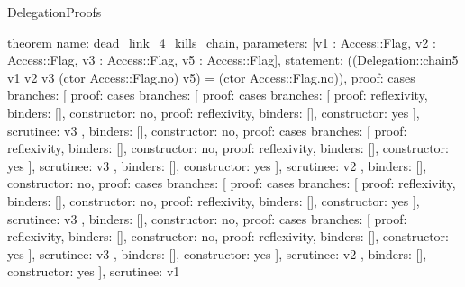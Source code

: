 \begin{lexlean}{DelegationProofs}
\begin{semanticmodule}
theorem{
  name: dead_link_4_kills_chain,
  parameters: [v1 : Access::Flag, v2 : Access::Flag, v3 : Access::Flag, v5 : Access::Flag],
  statement: ((Delegation::chain5 v1 v2 v3 (ctor Access::Flag.no) v5) = (ctor Access::Flag.no)),
  proof: cases{
    branches: [
      {proof: cases{
        branches: [
          {proof: cases{
            branches: [
              {proof: reflexivity{}, binders: [], constructor: no},
              {proof: reflexivity{}, binders: [], constructor: yes}
            ],
            scrutinee: v3
          }, binders: [], constructor: no},
          {proof: cases{
            branches: [
              {proof: reflexivity{}, binders: [], constructor: no},
              {proof: reflexivity{}, binders: [], constructor: yes}
            ],
            scrutinee: v3
          }, binders: [], constructor: yes}
        ],
        scrutinee: v2
      }, binders: [], constructor: no},
      {proof: cases{
        branches: [
          {proof: cases{
            branches: [
              {proof: reflexivity{}, binders: [], constructor: no},
              {proof: reflexivity{}, binders: [], constructor: yes}
            ],
            scrutinee: v3
          }, binders: [], constructor: no},
          {proof: cases{
            branches: [
              {proof: reflexivity{}, binders: [], constructor: no},
              {proof: reflexivity{}, binders: [], constructor: yes}
            ],
            scrutinee: v3
          }, binders: [], constructor: yes}
        ],
        scrutinee: v2
      }, binders: [], constructor: yes}
    ],
    scrutinee: v1
  }
}


\end{semanticmodule}
\end{lexlean}
